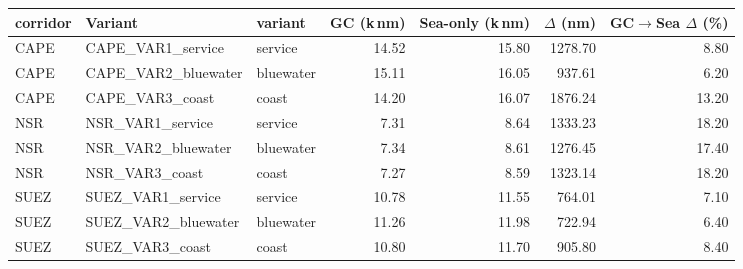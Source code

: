 \begin{tabular}{lllrrrr}
\toprule
corridor & Variant & variant & GC (k\,nm) & Sea-only (k\,nm) & $\Delta$ (nm) & GC$\to$Sea $\Delta$ (\%) \\
\midrule
CAPE & CAPE\_VAR1\_service   & service   & 14.52 & 15.80 & 1278.70 & 8.80 \\
CAPE & CAPE\_VAR2\_bluewater & bluewater & 15.11 & 16.05 &  937.61 & 6.20 \\
CAPE & CAPE\_VAR3\_coast     & coast     & 14.20 & 16.07 & 1876.24 & 13.20 \\
NSR  & NSR\_VAR1\_service    & service   &  7.31 &  8.64 & 1333.23 & 18.20 \\
NSR  & NSR\_VAR2\_bluewater  & bluewater &  7.34 &  8.61 & 1276.45 & 17.40 \\
NSR  & NSR\_VAR3\_coast      & coast     &  7.27 &  8.59 & 1323.14 & 18.20 \\
SUEZ & SUEZ\_VAR1\_service   & service   & 10.78 & 11.55 &  764.01 & 7.10 \\
SUEZ & SUEZ\_VAR2\_bluewater & bluewater & 11.26 & 11.98 &  722.94 & 6.40 \\
SUEZ & SUEZ\_VAR3\_coast     & coast     & 10.80 & 11.70 &  905.80 & 8.40 \\
\bottomrule
\end{tabular}